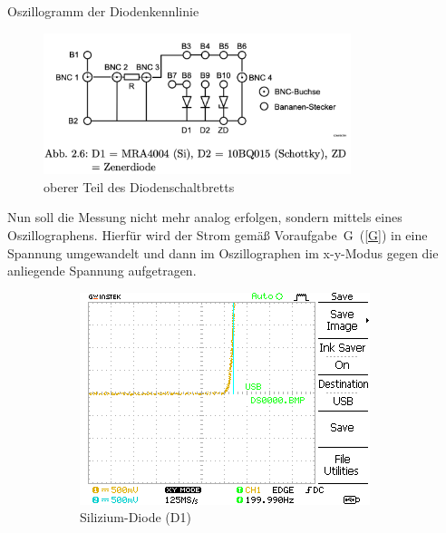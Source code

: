 \documentclass{article}
\theoremstyle{definition}
\begin{document}
\begin{aufgabe}{Oszillogramm der Diodenkennlinie}
    \aufbau
    \begin{figure}[H]
        \centering
        \includegraphics[width=0.8\textwidth]{figs/Aufbau2.png}
        \caption{oberer Teil des Diodenschaltbretts\cite{anleitung}}
        \label{aufbau_2_2}
    \end{figure}
Nun soll die Messung nicht mehr analog erfolgen, sondern mittels eines Oszillographens. Hierfür wird der Strom gemäß Voraufgabe~G~(\ref{G}) in eine Spannung umgewandelt und dann im Oszillographen im x-y-Modus gegen die anliegende Spannung aufgetragen.
    \messwerte 
    \begin{figure}[H]
        \centering
        \begin{subfigure}[b]{0.45 \textwidth}
            \includegraphics[width=\textwidth]{MesswerteVersuch2/m2_0.png}
            \caption{Silizium-Diode (D1)}
            \label{a2_0}
        \end{subfigure}
        \hfill
        \begin{subfigure}[b]{0.45 \textwidth}

\end{subfigure}
\end{figure}
\end{aufgabe}
\end{document}
